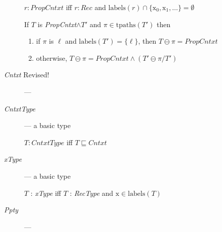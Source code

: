 \begin{description}
  $r:\textit{PropCntxt}$ iff
$r:\textit{Rec}$ and
$\mathrm{labels}(r)\cap\{\text{x}_0,\text{x}_1,\ldots\}=\emptyset$

\bigskip

If $T$ is \textit{PropCntxt}$\wedge T'$ and
  $\pi\in\mathrm{tpaths}(T')$ then
  \begin{enumerate}
    
  \item if $\pi$ is $\ell$ and $\mathrm{labels}(T')=\{\ell\}$, then $T\ominus\pi=\textit{PropCntxt}$
    
  \item otherwise, $T\ominus\pi= \textit{PropCntxt}\wedge(T'\ominus \pi/T')$
  \end{enumerate}

\item[\textnormal{\textit{Cntxt}} Revised!] --- 

        \item[\textnormal{\textit{CntxtType}}] --- a basic type

    $T:\textit{CntxtType}$ iff $T\sqsubseteq\textit{Cntxt}$
      

      
      
    \item[\textnormal{\textit{xType}}] --- a basic type

      $T$ : \textit{xType} iff $T$ : \textit{RecType} and $\text{x}\in\mathrm{labels}(T)$

      \item[\textnormal{\textit{Ppty}}] ---


\end{description}
